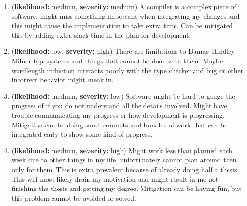 \documentclass[msc,lith,english]{liuthesis}
\begin{document}
\newcommand{\riskHeader}[2]{(\textbf{likelihood:} #1, \textbf{severity:} #2)}
\begin{enumerate}
  \item \riskHeader{medium}{medium} A compiler is a complex piece of software, might miss something important when integrating my changes and this might cause the implementation to take extra time. Can be mitigated this by adding extra slack time in the plan for development.

  \item \riskHeader{low}{high} There are limitations to Damas–Hindley–Milner typesystems and things that cannot be done with them. Maybe wordlength induction interacts poorly with the type checker and bug or other incorrect behavior might sneak in.

  \item \riskHeader{medium}{low} Software might be hard to gauge the progress of if you do not understand all the details involved. Might have trouble communicating my progress or how development is progressing. Mitigation can be doing small commits and bundles of work that can be integrated early to show some kind of progress.

  \item \riskHeader{medium}{high} Might work less than planned each week due to other things in my life, unfortunately cannot plan around then only for them. This is extra prevalent because of already doing half a thesis. This will most likely drain my motivation and might result in me not finishing the thesis and getting my degree. Mitigation can be having fun, but this problem cannot be avoided or solved.

\end{enumerate}

\todos
\end{document}
